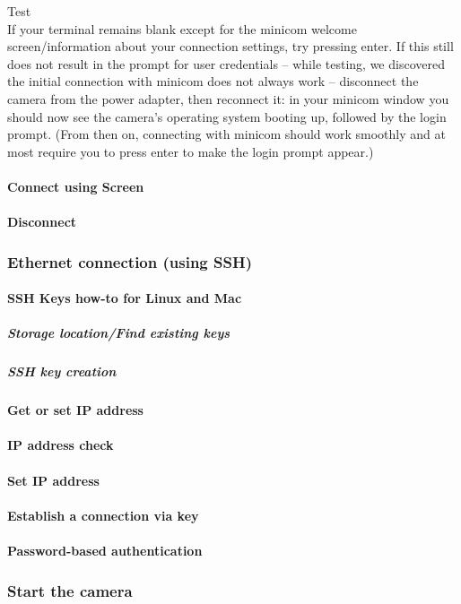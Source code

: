 Test\\

If your terminal remains blank except for the minicom welcome screen/information about your connection settings, try pressing enter. If this still does not result in the prompt for user credentials – while testing, we discovered the initial connection with minicom does not always work – disconnect the camera from the power adapter, then reconnect it: in your minicom window you should now see the camera's operating system booting up, followed by the login prompt. (From then on, connecting with minicom should work smoothly and at most require you to press enter to make the login prompt appear.)

\paragraph{Connect using Screen}
\paragraph{Disconnect}
\subsubsection{Ethernet connection (using SSH)}
\paragraph{SSH Keys how-to for Linux and Mac}
\subparagraph{Storage location/Find existing keys}
\subparagraph{SSH key creation}
\paragraph{Get or set IP address}
\paragraph{IP address check}
\paragraph{Set IP address}
\paragraph{Establish a connection via key}
\paragraph{Password-based authentication}
\subsubsection{Start the camera}
